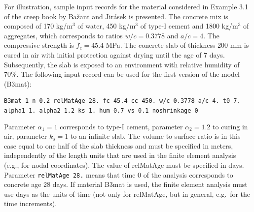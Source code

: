 \documentclass[a4paper]{article}
\begin{document}
For illustration, sample input records for the material considered in Example 3.1 of the creep
book by Ba\v{z}ant and Jir\'{a}sek is presented. The concrete mix is composed
of 170 kg/m$^3$ of water, 450 kg/m$^3$ of type-I cement and 1800 kg/m$^3$ of aggregates,
which corresponds to ratios $w/c=0.3778$ and $a/c=4$. The compressive strength 
is $\bar{f}_c=45.4$ MPa. The concrete slab of thickness 200 mm is cured in air
with initial protection against drying until the age of 7 days.
Subsequently, the slab is exposed to an environment with
relative humidity of 70\%. The following input record can be used for the first
version of the model (B3mat):

{\tt B3mat 1 n 0.2 relMatAge 28. fc 45.4 cc 450. w/c 0.3778 a/c 4. t0 7. alpha1 1. alpha2 1.2 ks 1. hum 0.7 vs 0.1 noshrinkage 0}

Parameter $\alpha_1=1$ corresponds to type-I cement, parameter $\alpha_2=1.2$
to curing in air, parameter $k_s=1$ to an infinite slab. 
The volume-to-surface ratio is in this case 
equal to one half of the slab thickness
and must be specified in meters, independently of the length units that are
used in the finite element analysis (e.g., for nodal coordinates).
The value of relMatAge must be specified in days.
Parameter {\tt relMatAge 28.}  means that time 0
of the analysis corresponds to concrete age 28 days. 
If material B3mat is used, the finite element analysis
must use days as the units of time (not only for relMatAge,
but in general, e.g.\ for the time increments).
\end{document}
